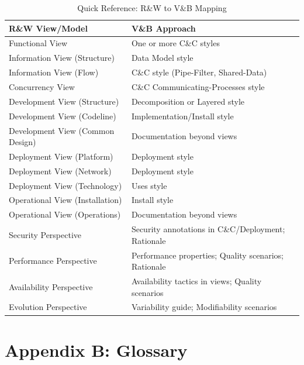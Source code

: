 \documentclass[11pt]{article}
\begin{document}
\begin{longtable}{@{}L{4cm} L{8.5cm}@{}}
\caption{Quick Reference: R\&W to V\&B Mapping} \\
\toprule
\textbf{R\&W View/Model} & \textbf{V\&B Approach} \\
\midrule
\endfirsthead
\bottomrule
\endlastfoot
Functional View & One or more C\&C styles \\
Information View (Structure) & Data Model style \\
Information View (Flow) & C\&C style (Pipe-Filter, Shared-Data) \\
Concurrency View & C\&C Communicating-Processes style \\
Development View (Structure) & Decomposition or Layered style \\
Development View (Codeline) & Implementation/Install style \\
Development View (Common Design) & Documentation beyond views \\
Deployment View (Platform) & Deployment style \\
Deployment View (Network) & Deployment style \\
Deployment View (Technology) & Uses style \\
Operational View (Installation) & Install style \\
Operational View (Operations) & Documentation beyond views \\
\midrule
Security Perspective & Security annotations in C\&C/Deployment; Rationale \\
Performance Perspective & Performance properties; Quality scenarios; Rationale \\
Availability Perspective & Availability tactics in views; Quality scenarios \\
Evolution Perspective & Variability guide; Modifiability scenarios \\
\end{longtable}

\section{Appendix B: Glossary}
\end{document}
